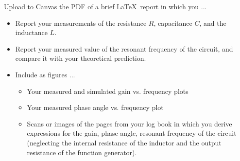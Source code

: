 \documentclass[11pt]{article}
\begin{document}
Upload to Canvas the PDF of a brief \LaTeX\ report in which you ...
\begin{itemize}
\item Report your measurements of the resistance $R$, capacitance $C$,
  and the inductance $L$.
\item Report your measured value of the resonant frequency of the
  circuit, and compare it with your theoretical prediction.
\item Include as figures ...
  \begin{itemize}
  \item Your measured and simulated gain vs. frequency plots
  \item Your measured phase angle vs. frequency plot
  \item Scans or images of the pages from your log book in which you
    derive expressions for the gain, phase angle, resonant frequency
    of the circuit (neglecting the internal resistance of the inductor
    and the output resistance of the function generator).
  \end{itemize}
\end{itemize}
\end{document}
